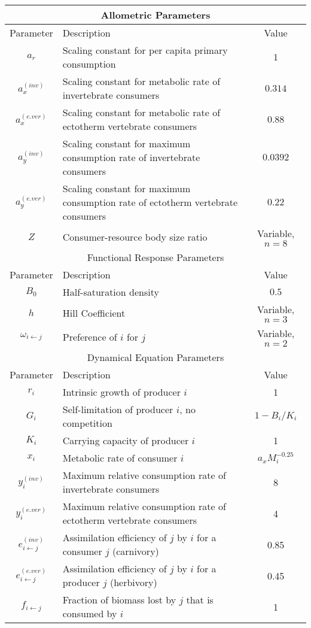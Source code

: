 \documentclass[11pt]{amsart}
\begin{document}
\begin{tabularx}{\textwidth}{|c|X|c|}
\multicolumn{3}{|c|}{Allometric Parameters}\\
\hline
Parameter&Description&Value\\
\hline
$a_r$&Scaling constant for per capita primary consumption&$1$\\
$a_x^{(inv)}$&Scaling constant for metabolic rate of invertebrate consumers & $0.314$\\
$a_x^{(e.ver)}$&Scaling constant for metabolic rate of ectotherm vertebrate consumers & $0.88$\\
$a_y^{(inv)}$&Scaling constant for maximum consumption rate of invertebrate consumers & $0.0392$\\
$a_y^{(e.ver)}$&Scaling constant for maximum consumption rate of ectotherm vertebrate consumers & $0.22$\\
$Z$&Consumer-resource body size ratio&Variable, $n=8$\\
\hline
\hline
\multicolumn{3}{|c|}{Functional Response Parameters}\\
\hline
Parameter&Description&Value\\
\hline
$B_0$&Half-saturation density&$0.5$\\
$h$&Hill Coefficient&Variable, $n=3$\\
$\omega_{i\leftarrow j}$&Preference of $i$ for $j$&Variable, $n=2$\\
\hline
\hline
\multicolumn{3}{|c|}{Dynamical Equation Parameters}\\
\hline
Parameter&Description&Value\\
\hline
$r_i$&Intrinsic growth of producer $i$&1\\
$G_i$&Self-limitation of producer $i$, no competition&$1-B_i/K_i$\\
$K_i$&Carrying capacity of producer $i$&1\\
$x_i$&Metabolic rate of consumer $i$&$a_x M_i^{-0.25}$\\
$y_i^{(inv)}$&Maximum relative consumption rate of invertebrate consumers & 8\\
$y_i^{(e.ver)}$&Maximum relative consumption rate of ectotherm vertebrate consumers& 4\\
$e_{i\leftarrow j}^{(inv)}$&Assimilation efficiency of $j$ by $i$ for a consumer $j$ (carnivory) & 0.85\\
$e_{i\leftarrow j}^{(e.ver)}$&Assimilation efficiency of $j$ by $i$ for a producer $j$ (herbivory) & 0.45\\
$f_{i\leftarrow j}$&Fraction of biomass lost by $j$ that is consumed by $i$ & 1\\

\end{tabularx}
\end{document}
